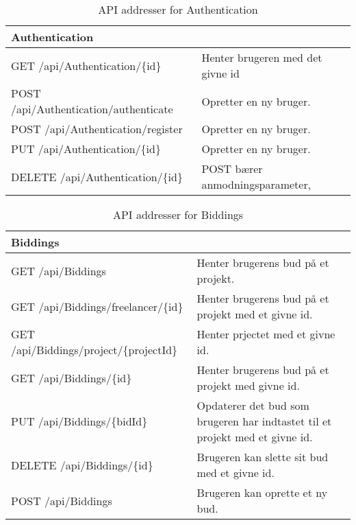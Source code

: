 \begin{table}[H]
	\centering
	\caption{API addresser for Authentication}
	\label{tab:web_user}
	\begin{tabular}{p{5cm}|p{11cm}}
		\hline
		\multicolumn{2}{l}{\textbf{Authentication}}\\
		\hline
		GET \newline
		/api/Authentication/\{id\} &
		Henter brugeren med det givne id\\
		\hline
		POST \newline
		/api/Authentication/authenticate &
		Opretter en ny bruger. \\
        \hline
        POST \newline
		/api/Authentication/register &
		Opretter en ny bruger. \\
        \hline
        PUT \newline
		/api/Authentication/\{id\} &
		Opretter en ny bruger. \\
		\hline
		DELETE \newline
		/api/Authentication/\{id\} &
		POST bærer anmodningsparameter,  \\
		\hline
	\end{tabular}
\end{table}


\begin{table}[H]
	
	\centering
	\caption{API addresser for Biddings}
	\label{tab:web_user}
	\begin{tabular}{p{5cm}|p{11cm}}
		\hline
		\multicolumn{2}{l}{\textbf{Biddings}}\\
		\hline
		GET \newline
		/api/Biddings &
		Henter brugerens bud på et projekt. \\
        \hline
        GET \newline
		/api/Biddings/freelancer/\{id\} &
		Henter brugerens bud på et projekt med et givne id. \\
        \hline
        GET \newline
		/api/Biddings/project/\{projectId\} &
		Henter prjectet med et givne id. \\
        \hline
        GET \newline
		/api/Biddings/\{id\} &
		Henter brugerens bud på et projekt med givne id. \\
		\hline
		PUT \newline
		/api/Biddings/\{bidId\} &
		Opdaterer det bud som brugeren har indtastet til et projekt med et givne id. \\
		\hline
		DELETE \newline
		/api/Biddings/\{id\} &
		Brugeren kan slette sit bud med et givne id. \\
		\hline
		POST \newline
		/api/Biddings &
		Brugeren kan oprette et ny bud. \\
		\hline
	
	\end{tabular}
\end{table}


